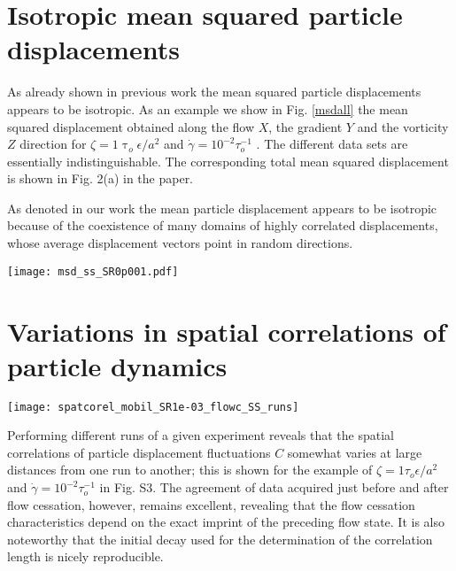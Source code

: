 \documentclass[aps,preprint,nofootinbib]{revtex4-1}
\begin{document}

\section{Isotropic mean squared particle displacements}

As already shown in previous work \cite{mohan} the mean squared particle displacements appears to be isotropic. As an example we show in Fig. \ref{msdall} the mean squared displacement obtained along the flow $X$, the gradient $Y$ and the vorticity $Z$ direction for $\zeta = 1 \uptau_o \epsilon/a^2$ and $\dot{\gamma} = 10^{-2} \tau_o^{-1}$ . The different data sets are essentially indistinguishable. The corresponding total mean squared displacement is shown in Fig. 2(a) in the paper. 

As denoted in our work the mean particle displacement appears to be isotropic because of the coexistence of many domains of highly correlated displacements, whose average displacement vectors point in random directions.\\

\begin{figure*}[h!]
\centering
\texttt{[image: msd\_ss\_SR0p001.pdf]}
\caption{\label{msdall} Particle mean squared displacements (MSD) along the flow $X$, the gradient $Y$ and the vorticity $Z$ direction obtained for $\zeta = 1 \uptau_o \epsilon/a^2$ and $\dot{\gamma} = 10^{-2} \tau_o^{-1}$.}
\end{figure*}
 
\section{Variations in spatial correlations of particle dynamics}
\begin{figure*}[h!]
\texttt{[image: spatcorel\_mobil\_SR1e-03\_flowc\_SS\_runs]}
\caption{\label{corel3} Spatial correlations of particle displacement fluctuations obtained for 3 independent runs with $\zeta = 1 \tau_o \epsilon/a^2$ and $\dot{\gamma} = 10^{-2} \tau_o^{-1}$. Data obtained during flow just before flow cessation are denoted as closed symbols, data obtained upon flow cessation are denoted as open symbols.} 
\end{figure*}
 Performing different runs of a given experiment reveals that the spatial correlations of particle displacement fluctuations $C$ somewhat varies at large distances from one run to another; this is shown for the example of $\zeta = 1 \tau_o \epsilon/a^2$ and $\dot{\gamma} = 10^{-2} \tau_o^{-1}$ in Fig. S3. The agreement of data acquired just before and after flow cessation, however, remains excellent, revealing that the flow cessation characteristics depend on the exact imprint of the preceding flow state. It is also noteworthy that the initial decay used for the determination of the correlation length is nicely reproducible.\\
\end{document}

